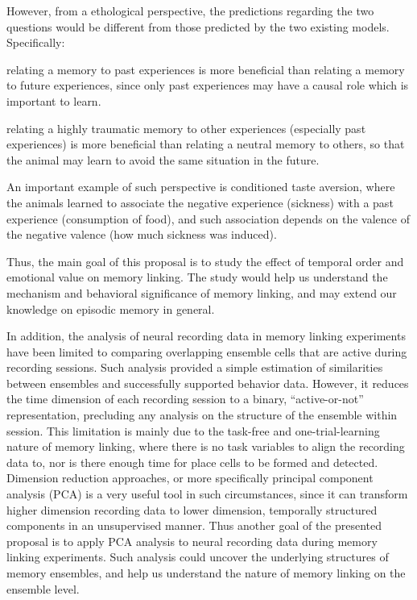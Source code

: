 \documentclass[master.tex]{subfiles}
\begin{document}
However, from a ethological perspective, the predictions regarding the two
questions would be different from those predicted by the two existing models.
Specifically:
\begin{inparaenum}[a)]
\item relating a memory to past experiences is more beneficial than relating a
  memory to future experiences, since only past experiences may have a causal
  role which is important to learn.
\item relating a highly traumatic memory to other experiences (especially past
  experiences) is more beneficial than relating a neutral memory to others, so
  that the animal may learn to avoid the same situation in the future.
\end{inparaenum}
An important example of such perspective is conditioned taste aversion, where
the animals learned to associate the negative experience (sickness) with a past
experience (consumption of food), and such association depends on the valence of
the negative valence (how much sickness was induced).

Thus, the main goal of this proposal is to study the effect of temporal order
and emotional value on memory linking. The study would help us understand the
mechanism and behavioral significance of memory linking, and may extend our
knowledge on episodic memory in general.

In addition, the analysis of neural recording data in memory linking experiments
have been limited to comparing overlapping ensemble cells that are active during
recording sessions. Such analysis provided a simple estimation of similarities
between ensembles and successfully supported behavior data. However, it reduces
the time dimension of each recording session to a binary, ``active-or-not''
representation, precluding any analysis on the structure of the ensemble within
session. This limitation is mainly due to the task-free and one-trial-learning
nature of memory linking, where there is no task variables to align the
recording data to, nor is there enough time for place cells to be formed and
detected. Dimension reduction approaches, or more specifically principal
component analysis (PCA) is a very useful tool in such circumstances, since it
can transform higher dimension recording data to lower dimension, temporally
structured components in an unsupervised manner. Thus another goal of the
presented proposal is to apply PCA analysis to neural recording data during
memory linking experiments. Such analysis could uncover the underlying
structures of memory ensembles, and help us understand the nature of memory
linking on the ensemble level.
\end{document}
